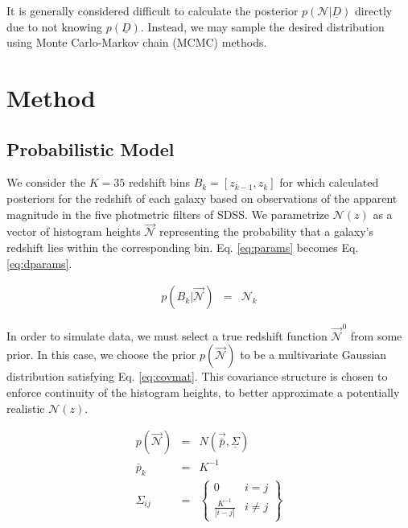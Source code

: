 \documentclass[12pt, onecolumn]{emulateapj}
\newcommand{\textul}{\underline}
\begin{document}
It is generally considered difficult to calculate the posterior $p(\mathcal{N}|\textul{D})$ directly due to not knowing $p(\textul{D})$.  Instead, we may sample the desired distribution using Monte Carlo-Markov chain (MCMC) methods.  

\section{Method}

\subsection{Probabilistic Model}

We consider the $K=35$ redshift bins $B_{k}=[z_{k-1},z_{k}]$ for which \citet{she11} calculated posteriors for the redshift of each galaxy based on observations of the apparent magnitude in the five photmetric filters of SDSS.  We parametrize $\mathcal{N}(z)$ as a vector of histogram heights $\vec{\mathcal{N}}$ representing the probability that a galaxy's redshift lies within the corresponding bin.  Eq. \ref{eq:params} becomes Eq. \ref{eq:dparams}.

\begin{eqnarray}
\label{eq:dparams}
p(B_{k}|\vec{\mathcal{N}}) &=& \mathcal{N}_{k}%
\end{eqnarray}

In order to simulate data, we must select a true redshift function $\vec{\mathcal{N}}^{0}$ from some prior.  In this case, we choose the prior $p(\vec{\mathcal{N}})$ to be a multivariate Gaussian distribution satisfying Eq. \ref{eq:covmat}.  This covariance structure is chosen to enforce continuity of the histogram heights, to better approximate a potentially realistic $\mathcal{N}(z)$.

\begin{mathletters}
\begin{eqnarray}
\label{eq:covmat}
p(\vec{\mathcal{N}}) &=& N(\vec{\bar{p}},\textul{\Sigma})\\
\bar{p}_{k} &=& K^{-1}\nonumber\\
\Sigma_{ij} &=& \left\{\begin{array}{cc}0& i=j\\\frac{K^{-1}}{|i-j|}&i\neq j\end{array}\right\}\nonumber
\end{eqnarray}
\end{mathletters}
\end{document}
